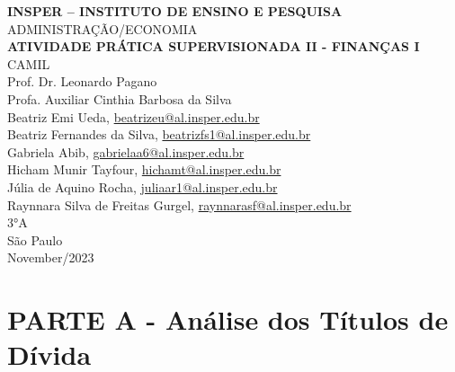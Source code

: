 \documentclass[11pt]{article}
\begin{document}
\begin{titlepage}
    \centering
    \vspace*{1cm}
    \Large\textbf{INSPER – INSTITUTO DE ENSINO E PESQUISA}\\
    \Large ADMINISTRAÇÃO/ECONOMIA\\
    \vspace{1.5cm}
    \Large\textbf{ATIVIDADE PRÁTICA SUPERVISIONADA II - FINANÇAS I}\\
    \vspace{1.5cm}
    \large CAMIL\\
    Prof. Dr. Leonardo Pagano\\
    Profa. Auxiliar Cinthia Barbosa da Silva\\
    \vfill
    \normalsize
    Beatriz Emi Ueda, \href{mailto:beatrizeu@al.insper.edu.br}{beatrizeu@al.insper.edu.br}\\
    Beatriz Fernandes da Silva, \href{mailto:beatrizfs1@al.insper.edu.br}{beatrizfs1@al.insper.edu.br}\\
    Gabriela Abib, \href{mailto:gabrielaa6@al.insper.edu.br}{gabrielaa6@al.insper.edu.br}\\
    Hicham Munir Tayfour, \href{mailto:hichamt@al.insper.edu.br}{hichamt@al.insper.edu.br}\\
    Júlia de Aquino Rocha, \href{mailto:juliaar1@al.insper.edu.br}{juliaar1@al.insper.edu.br}\\
    Raynnara Silva de Freitas Gurgel, \href{mailto:raynnarasf@al.insper.edu.br}{raynnarasf@al.insper.edu.br}\\
    3°A\\
    \vfill
    São Paulo\\
    November/2023
\end{titlepage}

\newpage
\tableofcontents
\thispagestyle{empty} %

\newpage
\setcounter{page}{1} %
\justify
\onehalfspacing

\pagestyle{fancy}
\fancyhf{}
\rhead{\thepage}

\section{\textbf{PARTE A - Análise dos Títulos de Dívida}}
\end{document}
